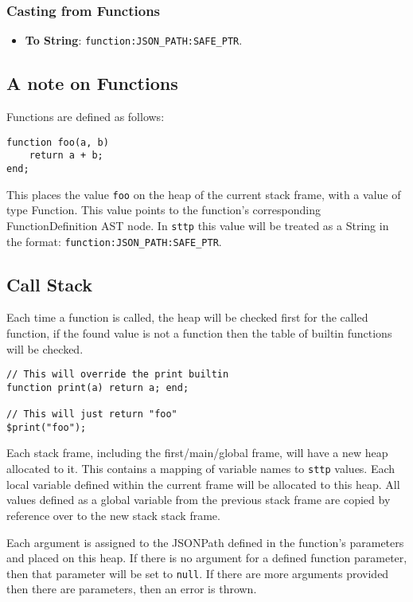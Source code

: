 \subsubsection{Casting from Functions}

\begin{itemize}
    \item \textbf{To String}: \verb|function:JSON_PATH:SAFE_PTR|.
\end{itemize}

\subsection{A note on Functions}

Functions are defined as follows:

\begin{verbatim}
function foo(a, b)
    return a + b;
end;
\end{verbatim}

This places the value \verb|foo| on the heap of the current stack frame, with a value of type Function. This value points to the function's corresponding FunctionDefinition AST node. In \verb|sttp| this value will be treated as a String in the format: \verb|function:JSON_PATH:SAFE_PTR|.

\subsection{Call Stack}
\label{sec:function-call-stack}

Each time a function is called, the heap will be checked first for the called function, if the found value is not a function then the table of builtin functions will be checked.

\begin{verbatim}
// This will override the print builtin
function print(a) return a; end;

// This will just return "foo"
$print("foo");
\end{verbatim}

Each stack frame, including the first/main/global frame, will have a new heap allocated to it. This contains a mapping of variable names to \verb|sttp| values. Each local variable defined within the current frame will be allocated to this heap. All values defined as a global variable from the previous stack frame are copied by reference over to the new stack stack frame.

Each argument is assigned to the JSONPath defined in the function's parameters and placed on this heap. If there is no argument for a defined function parameter, then that parameter will be set to \verb|null|. If there are more arguments provided then there are parameters, then an error is thrown.

